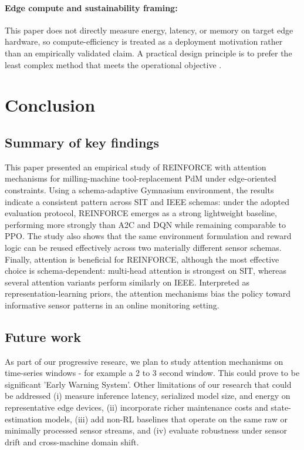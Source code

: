 \documentclass[sn-basic]{sn-jnl} %
\begin{document}
\paragraph{Edge compute and sustainability framing:}
This paper does not directly measure energy, latency, or memory on target edge hardware, so compute-efficiency is treated as a deployment motivation rather than an empirically validated claim. A practical design principle is to prefer the least complex method that meets the operational objective \cite{Schwartz2020, Strubell2019}.

\section{Conclusion}
\label{sec:conclusion}
\subsection{Summary of key findings}
This paper presented an empirical study of \textsc{REINFORCE} with attention mechanisms for milling-machine tool-replacement PdM under edge-oriented constraints. Using a schema-adaptive Gymnasium environment, the results indicate a consistent pattern across SIT and IEEE schemas: under the adopted evaluation protocol, \textsc{REINFORCE} emerges as a strong lightweight baseline, performing more strongly than \textsc{A2C} and \textsc{DQN} while remaining comparable to \textsc{PPO}. The study also shows that the same environment formulation and reward logic can be reused effectively across two materially different sensor schemas. Finally, attention is beneficial for \textsc{REINFORCE}, although the most effective choice is schema-dependent: multi-head attention is strongest on SIT, whereas several attention variants perform similarly on IEEE. Interpreted as representation-learning priors, the attention mechanisms bias the policy toward informative sensor patterns in an online monitoring setting.

\subsection{Future work}
As part of our progressive researc, we plan to study attention mechanisms on time-series windows - for example a 2 to 3 second window. This could prove to be significant 'Early Warning System'. Other limitations of our research that could be addressed (i) measure inference latency, serialized model size, and energy on representative edge devices, (ii) incorporate richer maintenance costs and state-estimation models, (iii) add non-RL baselines that operate on the same raw or minimally processed sensor streams, and (iv) evaluate robustness under sensor drift and cross-machine domain shift.
\end{document}
